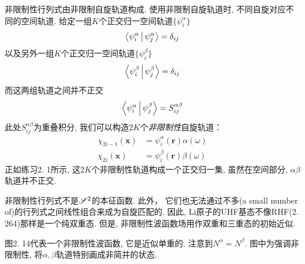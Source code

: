非限制性行列式由非限制自旋轨道构成. 
使用非限制自旋轨道时, 
不同自旋对应不同的空间轨道. 
给定一组$K$个正交归一空间轨道$\{\psi_i^\alpha\}$
\begin{align}
\Braket{\psi_i^\alpha|\psi_j^\alpha}=\delta_{ij}
\end{align}
以及另外一组$K$个正交归一空间轨道$\{\psi_i^\beta\}$
\begin{align}
\Braket{\psi_i^\beta|\psi_j^\beta}=\delta_{ij}
\end{align}
而这两组轨道之间并不正交
\begin{align}
\Braket{\psi_i^\alpha|\psi_j^\beta}=S_{ij}^{\alpha\beta}
\end{align}
此处$S_{ij}^{\alpha\beta}$为重叠积分, 
我们可以构造$2K$个\emph{非限制性}自旋轨道：
\begin{equation}
\begin{split}
\chi_{2i-1}(\mathbf{x}) &= \psi_i^\alpha(\mathbf{r})\alpha(\omega)\\
\chi_{2i}(\mathbf{x})   &= \psi_i^\beta(\mathbf{r})\beta(\omega) 
\end{split}
\end{equation}
正如练习2.
1所示, 
这$2K$个非限制性轨道构成一个正交归一集, 
虽然在空间部分, 
$\alpha$$\beta$轨道并不正交.


非限制性行列式不是$\mathscr{S}^2$的本征函数. 
此外， 
它们也无法通过不多(a small number of)的行列式之间线性组合来成为自旋匹配的. 
因此, 
Li原子的UHF基态不像RHF(2.
264)那样是一个纯双重态. 
但是, 
非限制性波函数场用作双重和三重态的初始近似. 


图2.
14代表一个非限制性波函数, 
它是近似单重的. 
注意到$N^\alpha = N^\beta$. 
图中为强调非限制性, 
将$\alpha,\beta$轨道特别画成非简并的状态.

